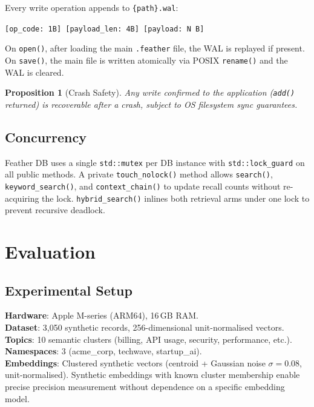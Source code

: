 \documentclass[11pt,twocolumn]{article}
\newtheorem{proposition}{Proposition}
\begin{document}
Every write operation appends to \texttt{\{path\}.wal}:

\begin{center}
\texttt{[op\_code: 1B] [payload\_len: 4B] [payload: N B]}
\end{center}

On \texttt{open()}, after loading the main \texttt{.feather} file, the WAL is
replayed if present. On \texttt{save()}, the main file is written atomically via
POSIX \texttt{rename()} and the WAL is cleared.

\begin{proposition}[Crash Safety]
Any write confirmed to the application (\texttt{add()} returned) is recoverable
after a crash, subject to OS filesystem sync guarantees.
\end{proposition}

\subsection{Concurrency}

Feather DB uses a single \texttt{std::mutex} per DB instance with
\texttt{std::lock\_guard} on all public methods. A private \texttt{touch\_nolock()}
method allows \texttt{search()}, \texttt{keyword\_search()}, and
\texttt{context\_chain()} to update recall counts without re-acquiring the lock.
\texttt{hybrid\_search()} inlines both retrieval arms under one lock to prevent
recursive deadlock.

\section{Evaluation}
\label{sec:eval}

\subsection{Experimental Setup}

\textbf{Hardware}: Apple M-series (ARM64), 16\,GB RAM.\\
\textbf{Dataset}: 3,050 synthetic records, 256-dimensional unit-normalised vectors.\\
\textbf{Topics}: 10 semantic clusters (billing, API usage, security, performance, etc.).\\
\textbf{Namespaces}: 3 (acme\_corp, techwave, startup\_ai).\\
\textbf{Embeddings}: Clustered synthetic vectors (centroid + Gaussian noise
$\sigma=0.08$, unit-normalised). Synthetic embeddings with known cluster membership
enable precise precision measurement without dependence on a specific embedding model.
\end{document}
